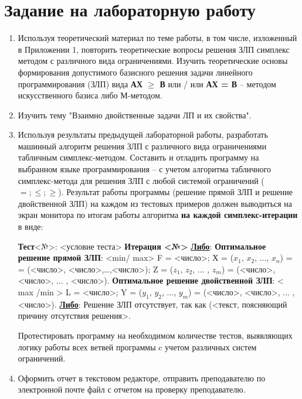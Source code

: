 \documentclass[a4paper,12pt]{article}
\begin{document}


\section{\normalsize{Задание на лабораторную работу}}
\begin{flushleft}
\justify
\begin{enumerate}
\item
    Используя теоретический материал по теме работы, в том числе, изложенный в Приложении 1, повторить теоретические вопросы решения ЗЛП симплекс методом с различного вида ограничениями. Изучить теоретические основы формирования допустимого базисного решения задачи линейного программирования (ЗЛП) вида   \textbf{АХ $\ge$ В}  или / или \textbf{АХ = В}  –  методом искусственного базиса либо М-методом.
\item
    Изучить тему "Взаимно двойственные задачи ЛП и их свойства".
\item
    Используя результаты предыдущей лабораторной работы, разработать машинный алгоритм решения ЗЛП с различного вида ограничениями табличным симплекс-методом.\newline
    Составить и отладить программу на выбранном языке  программирования – с учетом алгоритма табличного симплекс-метода для решения ЗЛП с любой системой ограничений ($= ; \le ; \ge $).
    Результат работы программы (решение прямой ЗЛП и решение двойственной ЗЛП) на каждом из тестовых примеров должен выводиться на экран монитора по итогам работы алгоритма \textbf{на каждой симплекс-итерации} в виде:
    
    \textbf{Тест}<№>: <условие теста>\newline
    \textbf{Итерация <№>}\newline
    \underline{\textbf{Либо}}:\newline
    \textbf{Оптимальное решение прямой  ЗЛП}:  <min/ max> F = <число>; Х = ($x_1$, $x_2$, ..., $x_n$) = 
    = (<число>, <число>,…,<число>); Z = ($z_1$, $z_2$, ... , $z_m$) = (<число>, <число>, ... , <число>).\newline
    \textbf{Оптимальное решение двойственной  ЗЛП}: < max /min > L = <число>; 
    Y = ($y_1$, $y_2$, ..., $y_m$) = (<число>, <число>, ... , <число>).\newline
    \underline{\textbf{Либо}}:\newline
    Решение ЗЛП отсутствует, так как (<текст, поясняющий причину отсутствия решения>.

    Протестировать программу на необходимом количестве тестов, выявляющих логику работы всех ветвей программы c учетом различных систем ограничений.
\item
  Оформить отчет в текстовом редакторе, отправить преподавателю по электронной почте файл с отчетом на проверку преподавателю.
\end{enumerate}
\end{flushleft}
\end{document}
